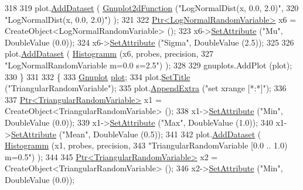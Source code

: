 \begin{DoxyCode}
318 
319     plot.\hyperlink{classns3_1_1Gnuplot_a306ec724a327cf9ab699700f31fca0a1}{AddDataset} ( \hyperlink{classns3_1_1Gnuplot2dFunction}{Gnuplot2dFunction} (\textcolor{stringliteral}{"LogNormalDist(x, 0.0, 2.0)"},
320                                          \textcolor{stringliteral}{"LogNormalDist(x, 0.0, 2.0)"}) );
321 
322     \hyperlink{classns3_1_1Ptr}{Ptr<LogNormalRandomVariable>} x6 = CreateObject<LogNormalRandomVariable> ();
323     x6->\hyperlink{classns3_1_1ObjectBase_ac60245d3ea4123bbc9b1d391f1f6592f}{SetAttribute} (\textcolor{stringliteral}{"Mu"}, DoubleValue (0.0));
324     x6->\hyperlink{classns3_1_1ObjectBase_ac60245d3ea4123bbc9b1d391f1f6592f}{SetAttribute} (\textcolor{stringliteral}{"Sigma"}, DoubleValue (2.5));
325 
326     plot.\hyperlink{classns3_1_1Gnuplot_a306ec724a327cf9ab699700f31fca0a1}{AddDataset} ( \hyperlink{main-random-variable-stream_8cc_a2cfd3837ab3f2e816cf53486d7a186b5}{Histogramm} (x6, probes, precision,
327                                   \textcolor{stringliteral}{"LogNormalRandomVariable m=0.0 s=2.5"}) );
328 
329     gnuplots.AddPlot (plot);
330   \}
331 
332   \{
333     \hyperlink{classns3_1_1Gnuplot}{Gnuplot} \hyperlink{lte__amc_8m_a5942306abe9f005572e4344e3cdef528}{plot};
334     plot.\hyperlink{classns3_1_1Gnuplot_ac01f15633d49f0239f8a45293a1e04f0}{SetTitle} (\textcolor{stringliteral}{"TriangularRandomVariable"});
335     plot.\hyperlink{classns3_1_1Gnuplot_a649a3041b9d0ea21a212b5ad9b28ecbf}{AppendExtra} (\textcolor{stringliteral}{"set xrange [*:*]"});
336 
337     \hyperlink{classns3_1_1Ptr}{Ptr<TriangularRandomVariable>} x1 = CreateObject<TriangularRandomVariable> 
      ();
338     x1->\hyperlink{classns3_1_1ObjectBase_ac60245d3ea4123bbc9b1d391f1f6592f}{SetAttribute} (\textcolor{stringliteral}{"Min"}, DoubleValue (0.0));
339     x1->\hyperlink{classns3_1_1ObjectBase_ac60245d3ea4123bbc9b1d391f1f6592f}{SetAttribute} (\textcolor{stringliteral}{"Max"}, DoubleValue (1.0));
340     x1->\hyperlink{classns3_1_1ObjectBase_ac60245d3ea4123bbc9b1d391f1f6592f}{SetAttribute} (\textcolor{stringliteral}{"Mean"}, DoubleValue (0.5));
341 
342     plot.\hyperlink{classns3_1_1Gnuplot_a306ec724a327cf9ab699700f31fca0a1}{AddDataset} ( \hyperlink{main-random-variable-stream_8cc_a2cfd3837ab3f2e816cf53486d7a186b5}{Histogramm} (x1, probes, precision,
343                                   \textcolor{stringliteral}{"TriangularRandomVariable [0.0 .. 1.0) m=0.5"}) );
344 
345     \hyperlink{classns3_1_1Ptr}{Ptr<TriangularRandomVariable>} x2 = CreateObject<TriangularRandomVariable> 
      ();
346     x2->\hyperlink{classns3_1_1ObjectBase_ac60245d3ea4123bbc9b1d391f1f6592f}{SetAttribute} (\textcolor{stringliteral}{"Min"}, DoubleValue (0.0));

\end{DoxyCode}
